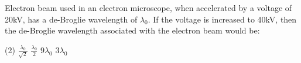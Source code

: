 \item Electron beam used in an electron microscope, when accelerated by a voltage of 20kV, has a de-Broglie wavelength of \( \lambda_0 \). If the voltage is increased to 40kV, then the de-Broglie wavelength associated with the electron beam would be:
    \begin{tasks}(2)
        \task \( \frac{\lambda_0}{\sqrt{2}} \)
        \task \( \frac{\lambda_0}{2} \)
        \task \( 9 \lambda_0 \)
        \task \( 3 \lambda_0 \)
    \end{tasks}